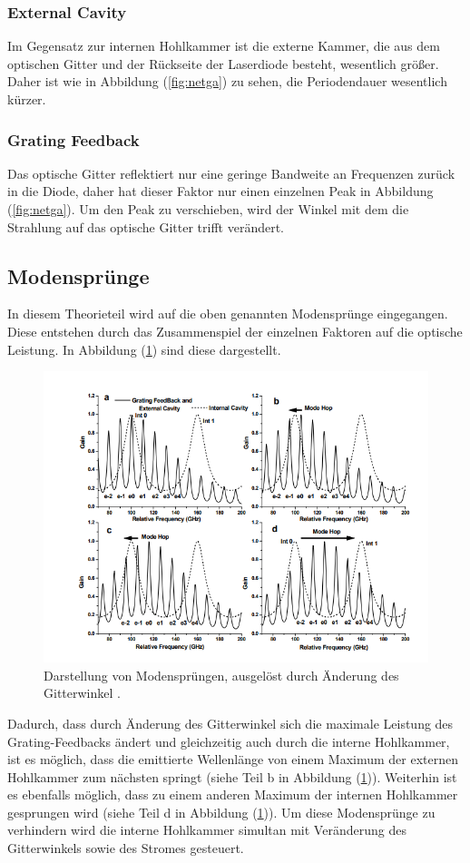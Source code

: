 \subsubsection{External Cavity}
Im Gegensatz zur internen Hohlkammer ist die externe Kammer, die aus dem optischen Gitter und der Rückseite der Laserdiode besteht, wesentlich größer. Daher ist wie in Abbildung (\ref{fig:netga}) zu sehen, die Periodendauer wesentlich kürzer.
\subsubsection{Grating Feedback}
Das optische Gitter reflektiert nur eine geringe Bandweite an Frequenzen zurück in die Diode, daher hat dieser Faktor nur einen einzelnen Peak in Abbildung (\ref{fig:netga}). Um den Peak zu verschieben,
wird der Winkel mit dem die Strahlung auf das optische Gitter trifft verändert.
\subsection{Modensprünge}
In diesem Theorieteil wird auf die oben genannten Modensprünge eingegangen. Diese entstehen durch das Zusammenspiel der einzelnen Faktoren auf die optische Leistung. In Abbildung (\ref{fig:mode}) sind
diese dargestellt.
\begin{figure}[h!]
  \centering
  \includegraphics[scale=0.7]{fig/mode.png}
  \caption{Darstellung von Modensprüngen, ausgelöst durch Änderung des Gitterwinkel \cite[10]{Anleitung}.}
  \label{fig:mode}
\end{figure}
\FloatBarrier
\noindent Dadurch, dass durch Änderung des Gitterwinkel sich die maximale Leistung des Grating-Feedbacks ändert und gleichzeitig auch durch die interne Hohlkammer, ist es möglich, dass die
emittierte Wellenlänge von einem Maximum der externen Hohlkammer zum nächsten springt (siehe Teil b in Abbildung (\ref{fig:mode})). Weiterhin ist es ebenfalls möglich, dass zu einem anderen Maximum der internen
Hohlkammer gesprungen wird (siehe Teil d in Abbildung (\ref{fig:mode})). Um diese Modensprünge zu verhindern wird die interne Hohlkammer simultan mit Veränderung des Gitterwinkels sowie des Stromes gesteuert.

